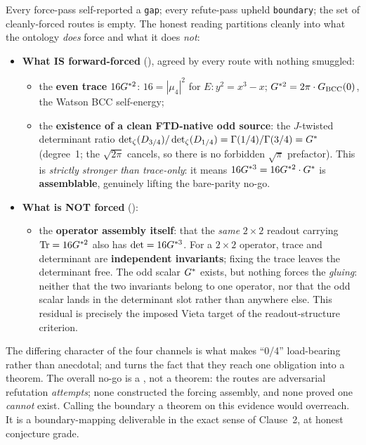  Every
force-pass self-reported a \texttt{gap}; every refute-pass upheld
\texttt{boundary}; the set of cleanly-forced routes is empty. The honest reading
partitions cleanly into what the ontology \emph{does} force and what it does
\emph{not}:
\begin{itemize}[leftmargin=1.4em, itemsep=4pt]
  \item \textbf{What IS forward-forced} (), agreed by every route with
        nothing smuggled:
    \begin{itemize}[leftmargin=1.2em, itemsep=2pt]
      \item the \textbf{even trace} $16G^{*2}$: $16=|\mu_4|^2$ for
            $E:y^2=x^3-x$; $G^{*2}=2\pi\cdot G_{\mathrm{BCC}}(0)$, the Watson BCC
            self-energy;
      \item the \textbf{existence of a clean FTD-native odd source}: the
            $J$-twisted determinant ratio
            $\det_\zeta(D_{3/4})/\det_\zeta(D_{1/4})=\Gamma(1/4)/\Gamma(3/4)=G^{*}$
            (degree~1; the $\sqrt{2\pi}$ cancels, so there is no forbidden
            $\sqrt\pi$ prefactor). This is \emph{strictly stronger than
            trace-only}: it means $16G^{*3}=16G^{*2}\cdot G^{*}$ is
            \textbf{assemblable}, genuinely lifting the bare-parity no-go.
    \end{itemize}
  \item \textbf{What is NOT forced} ():
    \begin{itemize}[leftmargin=1.2em, itemsep=2pt]
      \item the \textbf{operator assembly itself}: that the \emph{same}
            $2\times2$ readout carrying $\operatorname{Tr}=16G^{*2}$ also has $\det=16G^{*3}$. For
            a $2\times2$ operator, trace and determinant are \textbf{independent
            invariants}; fixing the trace leaves the determinant free. The odd
            scalar $G^{*}$ exists, but nothing forces the \emph{gluing}: neither
            that the two invariants belong to one operator, nor that the odd
            scalar lands in the determinant slot rather than anywhere else. This
            residual is precisely the imposed Vieta target of the
            readout-structure criterion.
    \end{itemize}
\end{itemize}
The differing character of the four channels is what makes ``0/4'' load-bearing
rather than anecdotal; and  turns the fact that they
reach one obligation into a theorem. The overall no-go is a , not a
theorem: the routes are adversarial refutation \emph{attempts}; none constructed
the forcing assembly, and none proved one \emph{cannot} exist. Calling the
boundary a theorem on this evidence would overreach. It is a boundary-mapping
deliverable in the exact sense of Clause~2, at honest conjecture grade.


